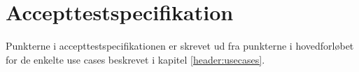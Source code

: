 \chapter{Accepttestspecifikation}

Punkterne i accepttestspecifikationen er skrevet ud fra punkterne i hovedforløbet for de enkelte use cases beskrevet i kapitel \ref{header:usecases}.
















